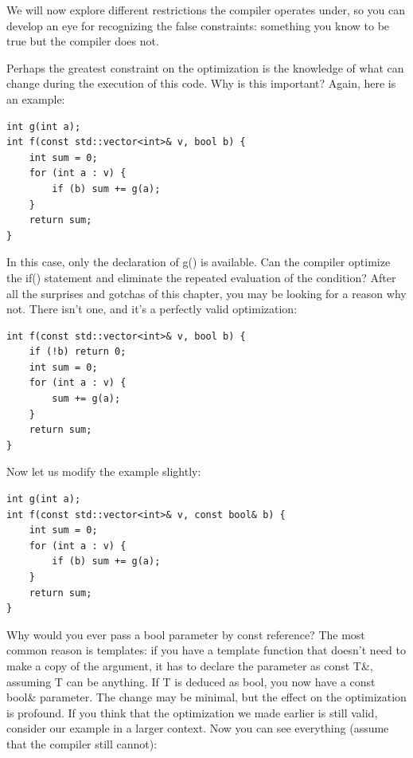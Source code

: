We will now explore different restrictions the compiler operates under, so you can develop an eye for recognizing the false constraints: something you know to be true but the compiler does not. 


Perhaps the greatest constraint on the optimization is the knowledge of what can change during the execution of this code. Why is this important? Again, here is an example:

\begin{lstlisting}[style=styleCXX]
int g(int a);
int f(const std::vector<int>& v, bool b) {
	int sum = 0;
	for (int a : v) {
		if (b) sum += g(a);
	}
	return sum;
} 
\end{lstlisting}

In this case, only the declaration of g() is available. Can the compiler optimize the if() statement and eliminate the repeated evaluation of the condition? After all the surprises and gotchas of this chapter, you may be looking for a reason why not. There isn't one, and it's a perfectly valid optimization:

\begin{lstlisting}[style=styleCXX]
int f(const std::vector<int>& v, bool b) {
	if (!b) return 0;
	int sum = 0;
	for (int a : v) {
		sum += g(a);
	}
	return sum;
} 

\end{lstlisting}

Now let us modify the example slightly:

\begin{lstlisting}[style=styleCXX]
int g(int a);
int f(const std::vector<int>& v, const bool& b) {
	int sum = 0;
	for (int a : v) {
		if (b) sum += g(a);
	}
	return sum;
} 
\end{lstlisting}

Why would you ever pass a bool parameter by const reference? The most common reason is templates: if you have a template function that doesn't need to make a copy of the argument, it has to declare the parameter as const T\&, assuming T can be anything. If T is deduced as bool, you now have a const bool\& parameter. The change may be minimal, but the effect on the optimization is profound. If you think that the optimization we made earlier is still valid, consider our example in a larger context. Now you can see everything (assume that the compiler still cannot):

